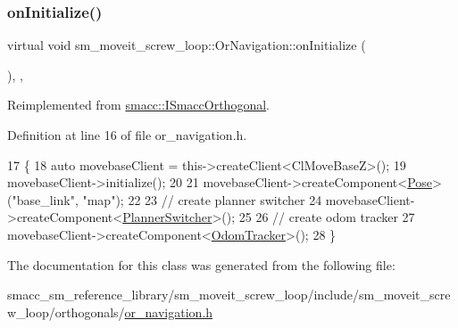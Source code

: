 \subsubsection{\texorpdfstring{on\+Initialize()}{onInitialize()}}
{\footnotesize\ttfamily virtual void sm\+\_\+moveit\+\_\+screw\+\_\+loop\+::\+Or\+Navigation\+::on\+Initialize (\begin{DoxyParamCaption}{ }\end{DoxyParamCaption})\hspace{0.3cm}{\ttfamily [inline]}, {\ttfamily [override]}, {\ttfamily [virtual]}}



Reimplemented from \hyperlink{classsmacc_1_1ISmaccOrthogonal_a6bb31c620cb64dd7b8417f8705c79c7a}{smacc\+::\+I\+Smacc\+Orthogonal}.



Definition at line 16 of file or\+\_\+navigation.\+h.


\begin{DoxyCode}
17     \{
18         \textcolor{keyword}{auto} movebaseClient = this->createClient<ClMoveBaseZ>();
19         movebaseClient->initialize();
20 
21         movebaseClient->createComponent<\hyperlink{classcl__move__base__z_1_1Pose}{Pose}>(\textcolor{stringliteral}{"base\_link"}, \textcolor{stringliteral}{"map"});
22 
23         \textcolor{comment}{// create planner switcher}
24         movebaseClient->createComponent<\hyperlink{classcl__move__base__z_1_1PlannerSwitcher}{PlannerSwitcher}>();
25 
26         \textcolor{comment}{// create odom tracker}
27         movebaseClient->createComponent<\hyperlink{classcl__move__base__z_1_1odom__tracker_1_1OdomTracker}{OdomTracker}>();
28     \}
\end{DoxyCode}


The documentation for this class was generated from the following file\+:\begin{DoxyCompactItemize}
\item 
smacc\+\_\+sm\+\_\+reference\+\_\+library/sm\+\_\+moveit\+\_\+screw\+\_\+loop/include/sm\+\_\+moveit\+\_\+screw\+\_\+loop/orthogonals/\hyperlink{sm__moveit__screw__loop_2include_2sm__moveit__screw__loop_2orthogonals_2or__navigation_8h}{or\+\_\+navigation.\+h}\end{DoxyCompactItemize}
